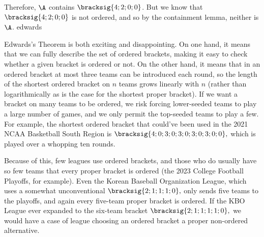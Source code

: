 {{        Therefore, $\A$ contains $\bracksig{4;2;0;0}$. But we know that $\bracksig{4;2;0;0}$ is not ordered, and so by the containment lemma, neither is $\A$.
    }{edwards}

    Edwards's Theorem is both exciting and disappointing. On one hand, it means that we can fully describe the set of ordered brackets, making it easy to check whether a given bracket is ordered or not. On the other hand, it means that in an ordered bracket at most three teams can be introduced each round, so the length of the shortest ordered bracket on $n$ teams grows linearly with $n$ (rather than logarithmically as is the case for the shortest proper bracket). If we want a bracket on many teams to be ordered, we risk forcing lower-seeded teams to play a large number of games, and we only permit the top-seeded teams to play a few. For example, the shortest ordered bracket that could've been used in the 2021 NCAA Basketball South Region is $\bracksig{4; 0; 3; 0; 3; 0; 3; 0; 3; 0; 0},$ which is played over a whopping ten rounds.


    Because of this, few leagues use ordered brackets, and those who do usually have so few teams that every proper bracket is ordered (the 2023 College Football Playoffs, for example). Even the Korean Baseball Organization League, which uses a somewhat unconventional $\bracksig{2; 1; 1; 1; 0},$ only sends five teams to the playoffs, and again every five-team proper bracket is ordered. If the KBO League ever expanded to the six-team bracket $\bracksig{2; 1; 1; 1; 1; 0},$ we would have a case of league choosing an ordered bracket a proper non-ordered alternative.
}